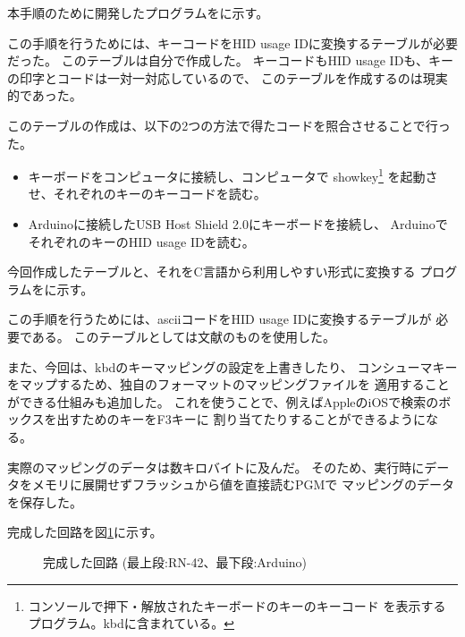 本手順のために開発したプログラムを\cite{bib:keymap_table_gen}に示す。

この手順を行うためには、キーコードをHID usage IDに変換するテーブルが必要だった。
このテーブルは自分で作成した。
キーコードもHID usage IDも、キーの印字とコードは一対一対応しているので、
このテーブルを作成するのは現実的であった。

このテーブルの作成は、以下の2つの方法で得たコードを照合させることで行った。
\begin{itemize}
 \item キーボードをコンピュータに接続し、コンピュータで
  showkey\footnote{コンソールで押下・解放されたキーボードのキーのキーコード
  を表示するプログラム。kbdに含まれている。}
  を起動させ、それぞれのキーのキーコードを読む。
 \item Arduinoに接続したUSB Host Shield 2.0にキーボードを接続し、
  ArduinoでそれぞれのキーのHID usage IDを読む。
\end{itemize}
今回作成したテーブルと、それをC言語から利用しやすい形式に変換する
プログラムを\cite{bib:keycode2hidusage}に示す。

この手順を行うためには、asciiコードをHID usage IDに変換するテーブルが
必要である。
このテーブルとしては文献\cite{bib:uhl}のものを使用した。

また、今回は、kbdのキーマッピングの設定を上書きしたり、
コンシューマキーをマップするため、独自のフォーマットのマッピングファイルを
適用することができる仕組みも追加した。
これを使うことで、例えばAppleのiOSで検索のボックスを出すためのキーをF3キーに
割り当てたりすることができるようになる。

実際のマッピングのデータは数キロバイトに及んだ。
そのため、実行時にデータをメモリに展開せずフラッシュから値を直接読むPGMで
マッピングのデータを保存した。

\bigskip
完成した回路を図\ref{fig:usb2bt2-rn42-comp}に示す。

\begin{figure}[H]
\centering
\begin{minipage}{0.5\linewidth}
\caption{完成した回路 (最上段:RN-42、最下段:Arduino)}
\label{fig:usb2bt2-rn42-comp}
\end{minipage}
\end{figure}
